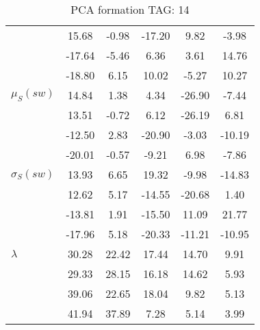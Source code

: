 \begin{table}[h!]
\begin{center}
\begin{tabular}{| l || c | c | c | c | c |}
 & 15.68  & -0.98  & -17.20  & 9.82  & -3.98 \\
 & -17.64  & -5.46  & 6.36  & 3.61  & 14.76 \\
 & -18.80  & 6.15  & 10.02  & -5.27  & 10.27 \\\hline
$\mu_S(sw)$ & 14.84  & 1.38  & 4.34  & -26.90  & -7.44 \\
 & 13.51  & -0.72  & 6.12  & -26.19  & 6.81 \\
 & -12.50  & 2.83  & -20.90  & -3.03  & -10.19 \\
 & -20.01  & -0.57  & -9.21  & 6.98  & -7.86 \\\hline
$\sigma_S(sw)$ & 13.93  & 6.65  & 19.32  & -9.98  & -14.83 \\
 & 12.62  & 5.17  & -14.55  & -20.68  & 1.40 \\
 & -13.81  & 1.91  & -15.50  & 11.09  & 21.77 \\
 & -17.96  & 5.18  & -20.33  & -11.21  & -10.95 \\\hline\hline
$\lambda$ & 30.28  & 22.42  & 17.44  & 14.70  & 9.91 \\
 & 29.33  & 28.15  & 16.18  & 14.62  & 5.93 \\
 & 39.06  & 22.65  & 18.04  & 9.82  & 5.13 \\
 & 41.94  & 37.89  & 7.28  & 5.14  & 3.99 \\\hline
\end{tabular}
\caption{PCA formation TAG: 14}
\end{center}
\end{table}